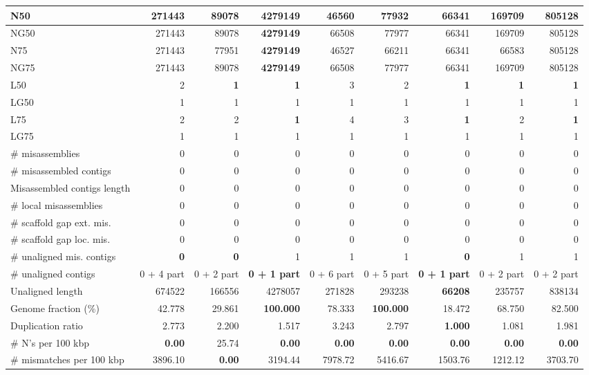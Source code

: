 \documentclass[12pt,a4paper]{article}
\begin{document}
\begin{table}[ht]
\begin{center}
\begin{tabular}{|l*{8}{|r}|}
N50 & 271443 & 89078 & {\bf 4279149} & 46560 & 77932 & 66341 & 169709 & 805128 \\ \hline
NG50 & 271443 & 89078 & {\bf 4279149} & 66508 & 77977 & 66341 & 169709 & 805128 \\ \hline
N75 & 271443 & 77951 & {\bf 4279149} & 46527 & 66211 & 66341 & 66583 & 805128 \\ \hline
NG75 & 271443 & 89078 & {\bf 4279149} & 66508 & 77977 & 66341 & 169709 & 805128 \\ \hline
L50 & 2 & {\bf 1} & {\bf 1} & 3 & 2 & {\bf 1} & {\bf 1} & {\bf 1} \\ \hline
LG50 & 1 & 1 & 1 & 1 & 1 & 1 & 1 & 1 \\ \hline
L75 & 2 & 2 & {\bf 1} & 4 & 3 & {\bf 1} & 2 & {\bf 1} \\ \hline
LG75 & 1 & 1 & 1 & 1 & 1 & 1 & 1 & 1 \\ \hline
\# misassemblies & 0 & 0 & 0 & 0 & 0 & 0 & 0 & 0 \\ \hline
\# misassembled contigs & 0 & 0 & 0 & 0 & 0 & 0 & 0 & 0 \\ \hline
Misassembled contigs length & 0 & 0 & 0 & 0 & 0 & 0 & 0 & 0 \\ \hline
\# local misassemblies & 0 & 0 & 0 & 0 & 0 & 0 & 0 & 0 \\ \hline
\# scaffold gap ext. mis. & 0 & 0 & 0 & 0 & 0 & 0 & 0 & 0 \\ \hline
\# scaffold gap loc. mis. & 0 & 0 & 0 & 0 & 0 & 0 & 0 & 0 \\ \hline
\# unaligned mis. contigs & {\bf 0} & {\bf 0} & 1 & 1 & 1 & {\bf 0} & 1 & 1 \\ \hline
\# unaligned contigs & 0 + 4 part & 0 + 2 part & {\bf 0 + 1 part} & 0 + 6 part & 0 + 5 part & {\bf 0 + 1 part} & 0 + 2 part & 0 + 2 part \\ \hline
Unaligned length & 674522 & 166556 & 4278057 & 271828 & 293238 & {\bf 66208} & 235757 & 838134 \\ \hline
Genome fraction (\%) & 42.778 & 29.861 & {\bf 100.000} & 78.333 & {\bf 100.000} & 18.472 & 68.750 & 82.500 \\ \hline
Duplication ratio & 2.773 & 2.200 & 1.517 & 3.243 & 2.797 & {\bf 1.000} & 1.081 & 1.981 \\ \hline
\# N's per 100 kbp & {\bf 0.00} & 25.74 & {\bf 0.00} & {\bf 0.00} & {\bf 0.00} & {\bf 0.00} & {\bf 0.00} & {\bf 0.00} \\ \hline
\# mismatches per 100 kbp & 3896.10 & {\bf 0.00} & 3194.44 & 7978.72 & 5416.67 & 1503.76 & 1212.12 & 3703.70 \\ \hline

\end{tabular}
\end{center}
\end{table}
\end{document}
